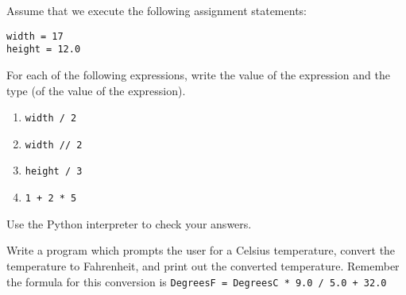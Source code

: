\begin{ex}
Assume that we execute the following assignment statements:

\begin{verbatim}
width = 17
height = 12.0
\end{verbatim}

For each of the following expressions, write the value of the
expression and the type (of the value of the expression).

\begin{enumerate}

\item {\tt width / 2}

\item {\tt width // 2}

\item {\tt height / 3}

\item {\tt 1 + 2 * 5}

\end{enumerate}

Use the Python interpreter to check your answers.
\end{ex}

\begin{ex}
Write a program which prompts the user for a Celsius temperature,
convert the temperature to Fahrenheit, and print out the converted
temperature. Remember the formula for this conversion is \linebreak
{\tt DegreesF = DegreesC * 9.0 / 5.0 + 32.0}
\end{ex}